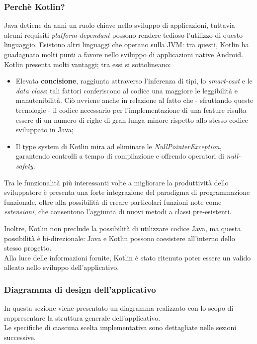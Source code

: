 \documentclass{natourDoc}
\begin{document}
\subsubsection{Perchè Kotlin?}
Java detiene da anni un ruolo chiave nello sviluppo di applicazioni, tuttavia alcuni requisiti \textit{platform-dependant} 
possono rendere tedioso l'utilizzo di questo linguaggio. Esistono altri linguaggi che operano sulla JVM: tra questi, Kotlin ha guadagnato
molti punti a favore nello sviluppo di applicazioni native Android. \\

Kotlin presenta molti vantaggi; tra essi si sottolineano:
\begin{itemize}
	\item Elevata \textbf{concisione}, raggiunta attraverso l'inferenza di tipi, lo \textit{smart-cast} e le \textit{data class}: 
			tali fattori conferiscono al codice una maggiore le leggibilità e manutenibilità. Ciò avviene anche in relazione al fatto che - sfruttando queste 
			tecnologie - il codice necessario per l'implementazione di una feature risulta essere di un numero di righe di gran lunga minore rispetto allo stesso codice sviluppato in Java; \\
	\item Il type system di Kotlin mira ad eliminare le \textit{NullPointerException}, garantendo controlli a tempo di compilazione e offrendo
			operatori di \textit{null-safety}.
\end{itemize}

Tra le funzionalità più interessanti volte a migliorare la produttività dello sviluppatore è presenta una forte integrazione del paradigma di
programmazione funzionale, oltre alla possibilità di creare particolari funzioni note come \textit{estensioni}, che consentono l'aggiunta
di nuovi metodi a classi pre-esistenti. 

Inoltre, Kotlin non preclude la possibilità di utilizzare codice Java, ma questa possibilità è bi-direzionale: Java e Kotlin possono coesistere
all'interno dello stesso progetto. \\

Alla luce delle informazioni fornite, Kotlin è stato ritenuto poter essere un valido alleato nello sviluppo dell'applicativo.

\newpage

\subsubsection{Diagramma di design dell'applicativo}
In questa sezione viene presentato un diagramma realizzato con lo scopo di rappresentare la struttura generale dell'applicativo. \\
Le specifiche di ciascuna scelta implementativa sono dettagliate nelle sezioni successive.
\begin{figure}[!htbp]
	\centering
	
\end{figure}
\end{document}
